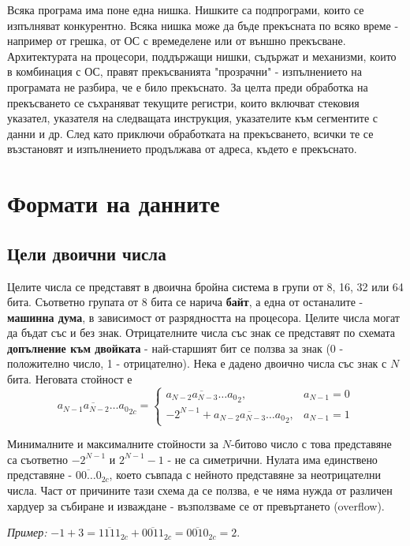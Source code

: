 \documentclass[fleqn,12pt]{article}
\begin{document}
Всяка програма има поне една нишка. Нишките са подпрограми, които се изпълняват конкурентно. Всяка нишка може да 
бъде прекъсната по всяко време - например от грешка, от ОС с времеделене или от външно прекъсване.
Архитектурата на процесори, поддържащи нишки, съдържат и механизми, които в комбинация с ОС, правят прекъсванията
"прозрачни" - изпълнението на програмата не разбира, че е било прекъснато. За целта преди обработка на прекъсването се съхраняват
текущите регистри, които включват стековия указател, указателя на следващата инструкция, указателите към сегментите с данни и др.
След като приключи обработката на прекъсването, всички те се възстановят и изпълнението продължава от адреса, където е прекъснато.

\section{Формати на данните}

\subsection{Цели двоични числа}
\label{subsection:integers}
Целите числа се представят в двоична бройна система в групи от 8, 16, 32 или 64 бита. Съответно групата от 8 бита се нарича \textbf{байт},
а една от останалите - \textbf{машинна дума}, в зависимост от разрядността на процесора. Целите числа могат да бъдат със и без знак.
Отрицателните числа със знак се представят по схемата \textbf{допълнение към двойката} - най-старшият бит се ползва за знак (0 - положително число, 1 - отрицателно).
Нека е дадено двоично числа със знак с $N$ бита. Неговата стойност е
\[ \overline{a_{N-1} a_{N-2} \dots a_0}_{2c} = \begin{cases}
    \overline{a_{N-2} a_{N-3} \dots a_0}_2, & a_{N-1} = 0 \\
    -2^{N-1} + \overline{a_{N-2} a_{N-3} \dots a_0}_2, & a_{N-1} = 1
\end{cases}
\]

Минималните и максималните стойности за $N$-битово число с това представяне са съответно $-2^{N-1}$ и $2^{N-1} - 1$ - не са симетрични. 
Нулата има единствено представяне - $\overline{00\dots0}_{2c}$, което съвпада с нейното представяне за неотрицателни числа.
Част от причините тази схема да се ползва, е че няма нужда от различен хардуер за събиране и изваждане - възползваме се от превъртането (overflow).

\textit{Пример: } $-1 + 3 = \overline{1111}_{2c} + \overline{0011}_{2c} = \overline{0010}_{2c} = 2$. 
\end{document}
